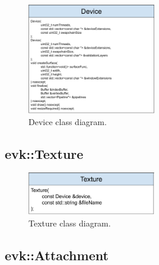 \documentclass[12pt]{report}
\newcommand{\figurewidth}{0.6\textwidth}
\newcommand{\imagewidth}{0.5\textwidth}
\theoremstyle{definition}
\begin{document}
        \begin{figure}
          \centering
          \includegraphics[width=\imagewidth]{images/class_device.png}
          \caption{Device class diagram.}
          \label{fig:class_device}  
        \end{figure}

      \subsection{evk::Texture}

        \begin{figure}
          \centering
          \includegraphics[width=\imagewidth]{images/class_texture.png}
          \caption{Texture class diagram.}
          \label{fig:class_texture}  
        \end{figure}

      \subsection{evk::Attachment}
\end{document}
